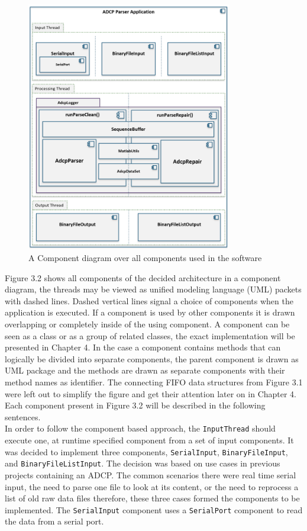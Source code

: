 \begin{figure}[h]
\centering
      \includegraphics[width=0.8\textwidth]{all_components}
        \caption{A Component diagram over all components used in the software}
\end{figure}

Figure 3.2 shows all components of the decided architecture in a component diagram, the threads may be viewed as unified modeling language (UML) packets with dashed lines. Dashed vertical lines signal a choice of components when the application is executed. If a component is used by other components it is drawn overlapping or completely inside of the using component. A component can be seen as a class or as a group of related classes, the exact implementation will be presented in Chapter 4. In the case a component contains methods that can logically be divided into separate components, the parent component is drawn as UML package and the methods are drawn as separate components with their method names as identifier. The connecting FIFO data structures from Figure 3.1 were left out to simplify the figure and get their attention later on in Chapter 4. Each component present in Figure 3.2 will be described in the following sentences. \\

In order to follow the component based approach, the \texttt{InputThread} should execute one, at runtime specified component from a set of input components. It was decided to implement three components, \texttt{SerialInput}, \texttt{BinaryFileInput}, and \texttt{BinaryFileListInput}. The decision was based on use cases in previous projects containing an ADCP. The common scenarios there were real time serial input, the need to parse one file to look at its content, or the need to reprocess a list of old raw data files therefore, these three cases formed the components to be implemented. The \texttt{SerialInput} component uses a \texttt{SerialPort} component to read the data from a serial port.\\ 


